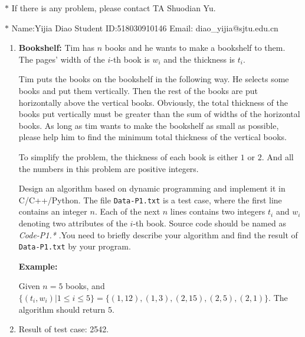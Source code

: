 \documentclass[12pt,a4paper]{article}
\makeatletter
\newtheorem*{solution}{Solution}
\theoremstyle{definition}
\renewenvironment{solution}[1][Solution] {\par\pushQED{\qed}\normalfont\topsep6\p@\@plus6\p@\relax\trivlist\item[\hskip\labelsep\bfseries#1\@addpunct{.}]\ignorespaces}{\popQED\endtrivlist\@endpefalse} \makeatother
\makeatother
\begin{document}
\noindent

\noindent{}
\begin{center}
\footnotesize{\color{red}$*$ If there is any problem, please contact TA Shuodian Yu.}

\footnotesize{\color{blue}$*$ Name:Yijia Diao \quad Student ID:518030910146 \quad Email: diao\_yijia@sjtu.edu.cn}
\end{center}

\begin{enumerate}
    \item
    \textbf{Bookshelf: }Tim has $n$ books and he wants to make a bookshelf to them. The pages' width of the $i$-th book is $w_i$ and the thickness is $t_i$. 

    Tim puts the books on the bookshelf in the following way. He selects some books and put them vertically. Then the rest of the books are put horizontally above the vertical books. Obviously, the total thickness of the books put vertically must be greater than the sum of widths of the horizontal books. As long as tim wants to make the bookshelf as small as possible, please help him to find the minimum total thickness of the vertical books.

    To simplify the problem, the thickness of each book is either $1$ or $2$. And all the numbers in this problem are positive integers.

    Design an algorithm based on dynamic programming and implement it in C/C++/Python. The file \texttt{Data-P1.txt} is a test case, where the first line contains an integer $n$. Each of the next $n$ lines contains two integers $t_i$ and $w_i$ denoting two attributes of the $i$-th book. Source code should be named as
    {\color{red}\emph{Code-P1.*}} .You need to briefly describe your algorithm and find the result of \texttt{Data-P1.txt} by your program.

    \textbf{Example:}

    Given $n=5$ books, and $\{(t_i,w_i)|1\leq i \leq 5\} = \{(1,12),(1,3),(2,15),(2,5),(2,1)\}$. The algorithm should return $5$.

    \begin{solution}
        Result of test case: 2542.
        

\end{solution}
\end{enumerate}
\end{document}

